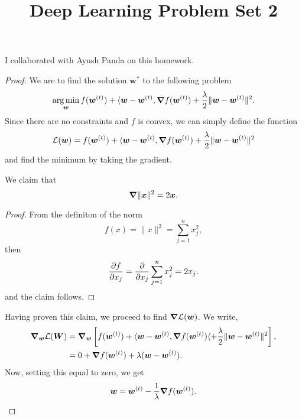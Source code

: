 \documentclass[twoside]{article}
\title{Deep Learning Problem Set 2}
\begin{document}
\maketitle

I collaborated with Ayush Panda on this homework.

\begin{proof}
	We are to find the solution $\bm{w}^{*}$ to the following problem
	\begin{equation*}
		\operatorname*{arg\,min}_{\bm{w}} f(\bm{w}^{(t)}) + \langle \bm{w} - \bm{w}^{(t)}, \grad f(\bm{w}^{(t)})
		+ \frac{\lambda}{2} \lVert \bm{w} - \bm{w}^{(t)} \rVert^{2}.
	\end{equation*}
	Since there are no constraints and $f$ is convex, we can simply define the function
	\begin{equation*}
		\mathcal{L}(\bm{w}) = f(\bm{w}^{(t)}) + \langle \bm{w} - \bm{w}^{(t)}, \grad f(\bm{w}^{(t)})
        + \frac{\lambda}{2} \lVert \bm{w} - \bm{w}^{(t)} \rVert^{2}
	\end{equation*}
    and find the minimum by taking the gradient. 

	\begin{claim}
		We claim that
		\begin{equation*}
			\grad \lVert \bm{x} \rVert^{2} = 2\bm{x}.
		\end{equation*}
		\begin{proof}
			From the definiton of the norm
			\begin{equation*}
				f(x) = \lVert x \rVert^{2} = \sum_{j = 1}^{n} x_{j}^{2},
			\end{equation*}
			then
			\begin{equation*}
				\pdv{f}{x_{j}} = \pdv{}{x_{j}} \sum_{j = 1}^{n} x_{j}^{2} = 2x_{j}.
			\end{equation*}
			and the claim follows.
		\end{proof}
	\end{claim}

	Having proven this claim, we proceed to find $\grad \mathcal{L}(\bm{w})$. We write,
	\begin{align*}
		\grad_{\bm{w}} \mathcal{L}(\bm{W}) & = \grad_{\bm{w}}
		\left[ f(\bm{w}^{(t)}) + \langle \bm{w} - \bm{w}^{(t)}, \grad f(\bm{w}^{(t)})\langle
		+ \frac{\lambda}{2} \lVert \bm{w} - \bm{w}^{(t)} \rVert^{2} \right],                               \\
		                                   & = 0 + \grad f(\bm{w}^{(t)}) + \lambda(\bm{w} - \bm{w}^{(t)}). \\
	\end{align*}
	Now, setting this equal to zero, we get
	\begin{equation*}
		\bm{w} = \bm{w}^{(t)} - \frac{1}{\lambda}\grad f(\bm{w}^{(t)}).
	\end{equation*}


\end{proof}
\end{document}
